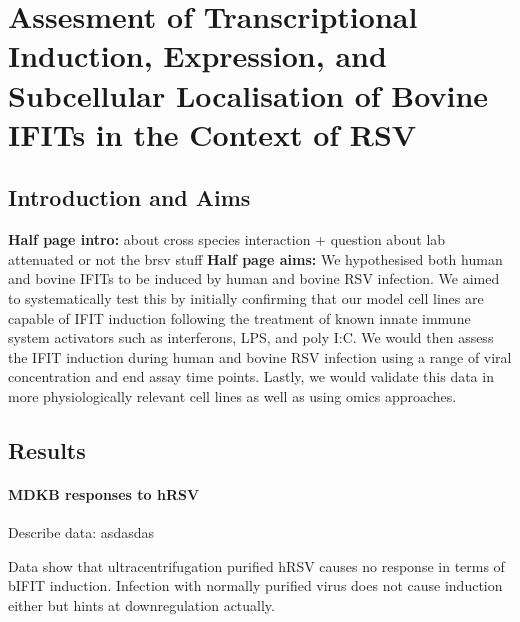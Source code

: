\chapter{Assesment of Transcriptional Induction, Expression, and Subcellular Localisation of Bovine IFITs in the Context of RSV} \label{Assesment of Transcriptional Induction, Expression, and Subcellular Localisation of Bovine IFITs in the Context of RSV}
\section{Introduction and Aims} \label{Introduction and Aims}
\textbf{Half page intro:}
about cross species interaction + question about lab attenuated or not the brsv stuff
\textbf{Half page aims:}
We hypothesised both human and bovine IFITs to be induced by human and bovine RSV infection. We aimed to systematically test this by initially confirming that our model cell lines are capable of IFIT induction following the treatment of known innate immune system activators such as interferons, LPS, and poly I:C. We would then assess the IFIT induction during human and bovine RSV infection using a range of viral concentration and end assay time points. Lastly, we would validate this data in more physiologically relevant cell lines as well as using omics approaches.

\section{Results} \label{Results}

\subsubsection{MDKB responses to hRSV} \label{MDKB responses to hRSV}
Describe data: \newline
asdasdas

Data show that ultracentrifugation purified hRSV causes no response in terms of bIFIT induction. Infection with normally purified virus does not cause induction either but hints at downregulation actually.

